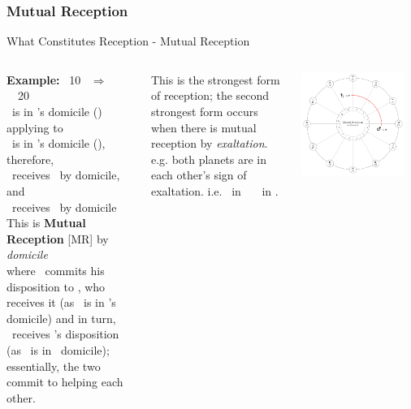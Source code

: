 \subsubsection{Mutual Reception}
\begin{frame}[t]{What Constitutes Reception - Mutual Reception}
\small
\begin{columns}[T, onlytextwidth]
\textbf{Example:} \Mars\ 10 \Capricorn\ $\Rightarrow$ \Square\ \Saturn\ 20 \Aries \\
\ul
\vspace{0.25cm}
\Mars\ is in \Saturn's domicile (\Capricorn) applying to \Saturn \\
\Saturn\ is in \Mars's domicile (\Aries), therefore, \\
\Mars\ receives \Saturn\ by domicile, and \\
\Saturn\ receives \Mars\ by domicile \\
\vspace{0.25cm}
\footnotesize
This is  \textbf{Mutual Reception} [MR] by \textsl{domicile} \\
where \Mars\ commits his disposition to \Saturn, who receives it (as \Mars\ is in \Saturn's domicile) and in turn, \Mars\ receives \Saturn's disposition (as \Saturn\ is in \Mars\ domicile); essentially, the two commit to helping each other.\footnotemark[1]

\vspace{0.25cm}
This is the strongest form of reception; the second strongest form occurs when there is mutual reception by \textsl{exaltation}. e.g. both planets are in each other's sign of exaltation. i.e. \Venus\ in \Cancer\ \Trine\ \Jupiter\ in \Pisces.


\begin{center}
{\includegraphics[width=0.9\textwidth]{charts/01-MR-by-domicile}} \\
\end{center}


\end{columns}
\end{frame}
